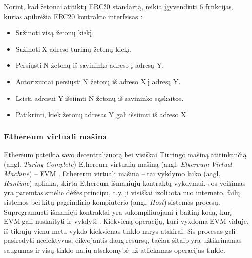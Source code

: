 \documentclass{VUMIFPSkursinis}
\begin{document}
Norint, kad žetonai atitiktų ERC20 standartą, reikia įgyvendinti 6 funkcijas, kurias apibrėžia ERC20 kontrakto interfeisas \cite{hildenbrandt2017kevm}:
\begin{itemize}
    \item Sužinoti visą žetonų kiekį. 
    \item Sužinoti X adreso turimų žetonų kiekį. 
    \item Persiųsti N žetonų iš savininko adreso į adresą Y.
    \item Autorizuotai persiųsti N žetonų iš adreso X į adresą Y.
    \item Leisti adresui Y išsiimti N žetonų iš savininko sąskaitos.
    \item Patikrinti, kiek žetonų adresas Y gali išsiimti iš adreso X.
\end{itemize}

\subsubsection{Ethereum virtuali mašina}
Ethereum pateikia savo decentralizuotą bei visiškai Tiuringo mašiną atitinkančią (angl. \textit{Turing Complete}) Ethereum virtualią mašiną (angl. \textit{Ethereum Virtual Machine}) – EVM \cite{buterin2014next}. Ethereum virtuali mašina – tai vykdymo laiko (angl. \textit{Runtime}) aplinka, skirta Ethereum išmaniųjų kontraktų vykdymui. Jos veikimas yra paremtas smėlio dėžės principu, t.y. ji visiškai izoliuota nuo interneto, failų sistemos bei kitų pagrindinio kompiuterio (angl. \textit{Host}) sistemos procesų. Suprogramuoti išmanieji kontraktai yra sukompiliuojami į baitinį kodą, kurį EVM gali nuskaityti ir vykdyti \cite{luu2016making}. Kiekvieną operaciją, kuri vykdoma EVM viduje, iš tikrųjų vienu metu vykdo kiekvienas tinklo narys atskirai. Šis procesas gali pasirodyti  neefektyvus, eikvojantis daug resursų, tačiau šitaip yra užtikrinamas saugumas ir visų tinklo narių atsakomybė už atliekamas operacijas tinkle. 
\end{document}
